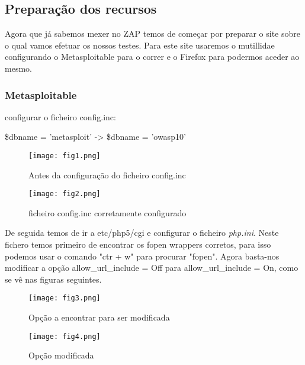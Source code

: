

\subsection{Preparação dos recursos}

Agora que já sabemos mexer no ZAP temos de começar por preparar o site sobre o qual vamos efetuar os nossos testes. Para este site usaremos o mutillidae configurando o Metasploitable para o correr e o Firefox para podermos aceder ao mesmo.

\subsubsection{Metasploitable}

 configurar o ficheiro config.inc:

  \$dbname = 'metasploit' -> \$dbname = 'owasp10'
\begin{figure}[H]

  \centering

  \texttt{[image: fig1.png]}

  \caption{Antes da configuração do ficheiro config.inc}

\end{figure}

\begin{figure}[H]

  \centering

  \texttt{[image: fig2.png]}

  \caption{ficheiro config.inc corretamente configurado}

\end{figure}


De seguida temos de ir a etc/php5/cgi e configurar o ficheiro \textit{php.ini}.
Neste fichero temos primeiro de encontrar os fopen wrappers corretos, para isso podemos usar o comando "ctr + w" para procurar "fopen". Agora basta-nos modificar a opção allow\_url\_include = Off para allow\_url\_include = On, como se vê nas figuras seguintes.

\begin{figure}[H]

  \centering

  \texttt{[image: fig3.png]}
 
  \caption{Opção a encontrar para ser modificada}

\end{figure}

\begin{figure}[H]

  \centering

  \texttt{[image: fig4.png]}

  \caption{Opção modificada}

\end{figure}

